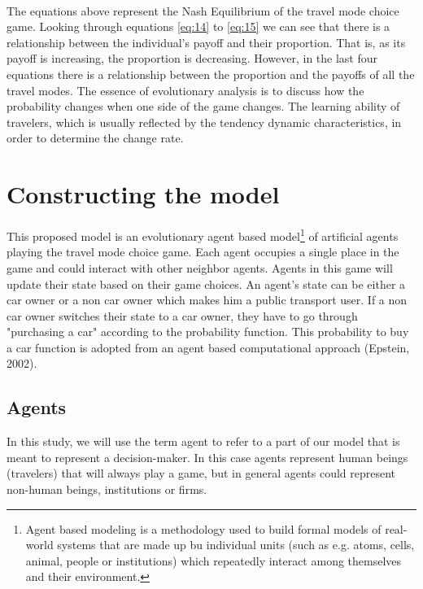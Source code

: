 \paragraph{}The equations above represent the Nash Equilibrium of the travel mode choice game. Looking through equations \ref{eq:14} to \ref{eq:15} we can see that there is a relationship between the individual's payoff and their proportion. That is, as its payoff is increasing, the proportion is decreasing. However, in the last four equations there is a relationship between the proportion and the payoffs of all the travel modes.
The essence of evolutionary analysis is to discuss how the probability changes when one side of the game changes. The learning ability of travelers, which is usually reflected by the tendency dynamic characteristics, in order to determine the change rate.
\section{Constructing the model}
This proposed model is an evolutionary agent based model\footnote{Agent based modeling is a methodology used to build formal models of real-world systems that are made up bu individual units (such as e.g. atoms, cells, animal, people or institutions) which repeatedly interact among themselves and their environment.} of artificial agents playing the travel mode choice game. Each agent occupies a single place in the game and could interact with other neighbor agents. Agents in this game will update their state based on their game choices. An agent's state can be either a car owner or a non car owner which makes him a public transport user. If a non car owner switches their state to a car owner, they have to go through "purchasing a car" according to the probability function. This probability to buy a car function is adopted from an agent based computational approach (Epstein, 2002).

\subsection{Agents}
In this study, we will use the term agent to refer to a part of our model that is meant to represent a decision-maker. In this case agents represent human beings (travelers) that will always play a game, but in general agents could represent non-human beings, institutions or firms.
